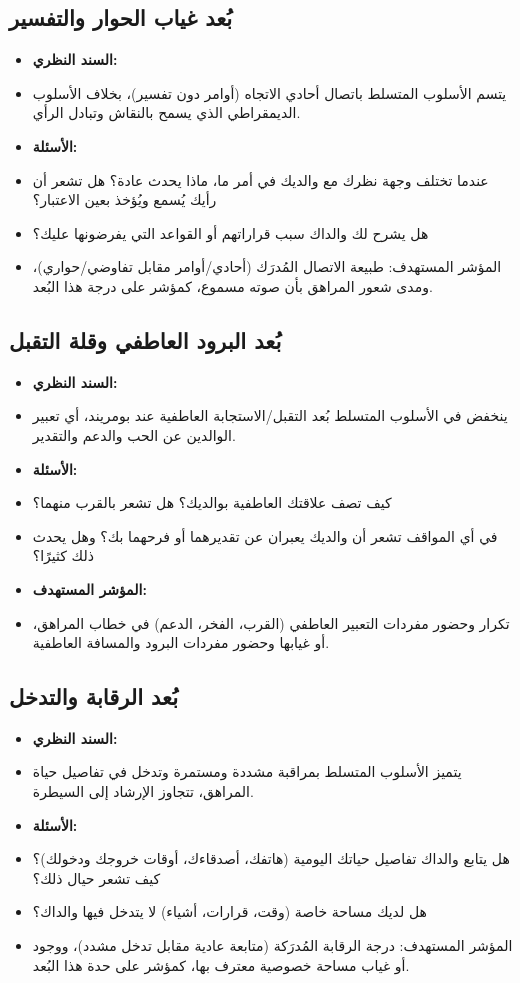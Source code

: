 \documentclass[12pt,oneside]{report}
\begin{document}
\subsection*{بُعد غياب الحوار والتفسير}
\begin{itemize}[leftmargin=1.6em,itemsep=1pt]
\item \textbf{السند النظري:}
\item يتسم الأسلوب المتسلط باتصال أحادي الاتجاه (أوامر دون تفسير)، بخلاف الأسلوب الديمقراطي الذي يسمح بالنقاش وتبادل الرأي.
\item \textbf{الأسئلة:}
\item عندما تختلف وجهة نظرك مع والديك في أمر ما، ماذا يحدث عادة؟ هل تشعر أن رأيك يُسمع ويُؤخذ بعين الاعتبار؟
\item هل يشرح لك والداك سبب قراراتهم أو القواعد التي يفرضونها عليك؟
\item المؤشر المستهدف: طبيعة الاتصال المُدرَك (أحادي/أوامر مقابل تفاوضي/حواري)، ومدى شعور المراهق بأن صوته مسموع، كمؤشر على درجة هذا البُعد.
\end{itemize}
\subsection*{بُعد البرود العاطفي وقلة التقبل}
\begin{itemize}[leftmargin=1.6em,itemsep=1pt]
\item \textbf{السند النظري:}
\item ينخفض في الأسلوب المتسلط بُعد التقبل/الاستجابة العاطفية عند بومريند، أي تعبير الوالدين عن الحب والدعم والتقدير.
\item \textbf{الأسئلة:}
\item كيف تصف علاقتك العاطفية بوالديك؟ هل تشعر بالقرب منهما؟
\item في أي المواقف تشعر أن والديك يعبران عن تقديرهما أو فرحهما بك؟ وهل يحدث ذلك كثيرًا؟
\item \textbf{المؤشر المستهدف:}
\item تكرار وحضور مفردات التعبير العاطفي (القرب، الفخر، الدعم) في خطاب المراهق، أو غيابها وحضور مفردات البرود والمسافة العاطفية.
\end{itemize}
\subsection*{بُعد الرقابة والتدخل}
\begin{itemize}[leftmargin=1.6em,itemsep=1pt]
\item \textbf{السند النظري:}
\item يتميز الأسلوب المتسلط بمراقبة مشددة ومستمرة وتدخل في تفاصيل حياة المراهق، تتجاوز الإرشاد إلى السيطرة.
\item \textbf{الأسئلة:}
\item هل يتابع والداك تفاصيل حياتك اليومية (هاتفك، أصدقاءك، أوقات خروجك ودخولك)؟ كيف تشعر حيال ذلك؟
\item هل لديك مساحة خاصة (وقت، قرارات، أشياء) لا يتدخل فيها والداك؟
\item المؤشر المستهدف: درجة الرقابة المُدرَكة (متابعة عادية مقابل تدخل مشدد)، ووجود أو غياب مساحة خصوصية معترف بها، كمؤشر على حدة هذا البُعد.
\end{itemize}
\end{document}
